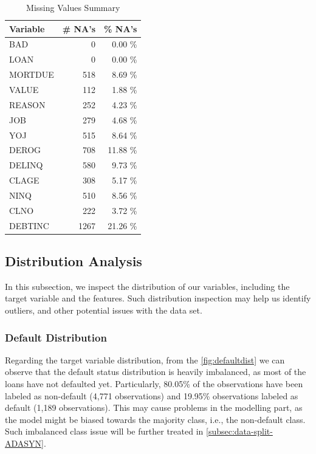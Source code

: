 \begin{table}[H]
\small
\setlength{\tabcolsep}{8pt}
\renewcommand{\arraystretch}{1.3}
\centering
\caption[Missing Values Summary]{Missing Values Summary}\label{tab:natable}
\begin{tabular}{l r r}
\toprule
\textbf{Variable} & \textbf{\# NA's} & \textbf{\% NA's}\\
\midrule
\hline
BAD & 0 & 0.00 \% \\
LOAN & 0 & 0.00 \% \\
MORTDUE & 518 & 8.69 \% \\
VALUE & 112 & 1.88 \% \\
REASON & 252 & 4.23 \% \\
JOB & 279 & 4.68 \% \\
YOJ & 515 & 8.64 \% \\
DEROG & 708 & 11.88 \% \\
DELINQ & 580 & 9.73 \% \\
CLAGE & 308 & 5.17 \% \\
NINQ & 510 & 8.56 \% \\
CLNO & 222 & 3.72 \% \\
DEBTINC & 1267 & 21.26 \% \\
\hline
\bottomrule
\end{tabular}
\vspace{0.35em}

\vspace{-1em}
\end{table}


\subsection{Distribution Analysis}
\label{subsec:distribution}
In this subsection, we inspect the distribution of our variables, including the target variable and the features.
Such distribution inspection may help us identify outliers, and other potential issues with the data set.

\subsubsection{Default Distribution}
\label{subsubsec:defaultdist}

Regarding the target variable distribution, from the \autoref{fig:defaultdist} we can observe that the default status distribution is heavily imbalanced, as most of the loans have not defaulted yet.
Particularly, 80.05\% of the observations have been labeled as non-default (4,771 observations) and 19.95\% observations labeled as default (1,189 observations).
This may cause problems in the modelling part, as the model might be biased towards the majority class, i.e., the non-default class. Such imbalanced class issue will be further treated in \autoref{subsec:data-split-ADASYN}.

